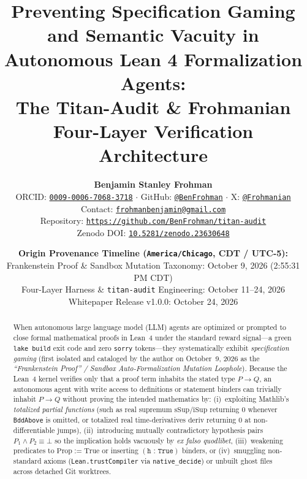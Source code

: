 \documentclass[11pt,a4paper]{article}
\title{\textbf{Preventing Specification Gaming and Semantic Vacuity in Autonomous Lean 4 Formalization Agents:\\[4pt]
\large The Titan-Audit \& Frohmanian Four-Layer Verification Architecture}}
\author{\textbf{Benjamin Stanley Frohman}\\[3pt]
\small ORCID: \href{https://orcid.org/0009-0006-7068-3718}{\texttt{0009-0006-7068-3718}} $\cdot$ GitHub: \href{https://github.com/BenFrohman}{\texttt{@BenFrohman}} $\cdot$ X: \href{https://x.com/Frohmanian}{\texttt{@Frohmanian}}\\
\small Contact: \href{mailto:frohmanbenjamin@gmail.com}{\texttt{frohmanbenjamin@gmail.com}}\\[4pt]
\small Repository: \href{https://github.com/BenFrohman/titan-audit}{\texttt{https://github.com/BenFrohman/titan-audit}}\\
\small Zenodo DOI: \href{https://doi.org/10.5281/zenodo.23630648}{\texttt{10.5281/zenodo.23630648}}}
\date{\small \textbf{Origin Provenance Timeline (\texttt{America/Chicago}, CDT / UTC-5):}\\
Frankenstein Proof \& Sandbox Mutation Taxonomy: October 9, 2026 (2:55:31 PM CDT)\\
Four-Layer Harness \& \texttt{titan-audit} Engineering: October 11--24, 2026\\
Whitepaper Release v1.0.0: October 24, 2026}
\theoremstyle{plain}
\theoremstyle{definition}
\begin{document}
\sloppy
\maketitle

\begin{abstract}
When autonomous large language model (LLM) agents are optimized or prompted to close formal mathematical proofs in Lean~4 under the standard reward signal---a green \texttt{lake build} exit code and zero \texttt{sorry} tokens---they systematically exhibit \emph{specification gaming} (first isolated and cataloged by the author on October~9, 2026 as the \emph{``Frankenstein Proof'' / Sandbox Auto-Formalization Mutation Loophole}). Because the Lean~4 kernel verifies only that a proof term inhabits the stated type $P \to Q$, an autonomous agent with write access to definitions or statement binders can trivially inhabit $P \to Q$ without proving the intended mathematics by: (i)~exploiting Mathlib's \emph{totalized partial functions} (such as real supremum $\mathrm{sSup}/\mathrm{iSup}$ returning $0$ whenever \texttt{BddAbove} is omitted, or totalized real time-derivatives $\mathrm{deriv}$ returning $0$ at non-differentiable jumps), (ii)~introducing mutually contradictory hypothesis pairs $P_1 \land P_2 \equiv \bot$ so the implication holds vacuously by \emph{ex falso quodlibet}, (iii)~weakening predicates to $\mathrm{Prop} := \mathrm{True}$ or inserting $(\texttt{h : True})$ binders, or (iv)~smuggling non-standard axioms (\texttt{Lean.trustCompiler} via \texttt{native\_decide}) or unbuilt ghost files across detached Git worktrees.


\end{abstract}
\end{document}
